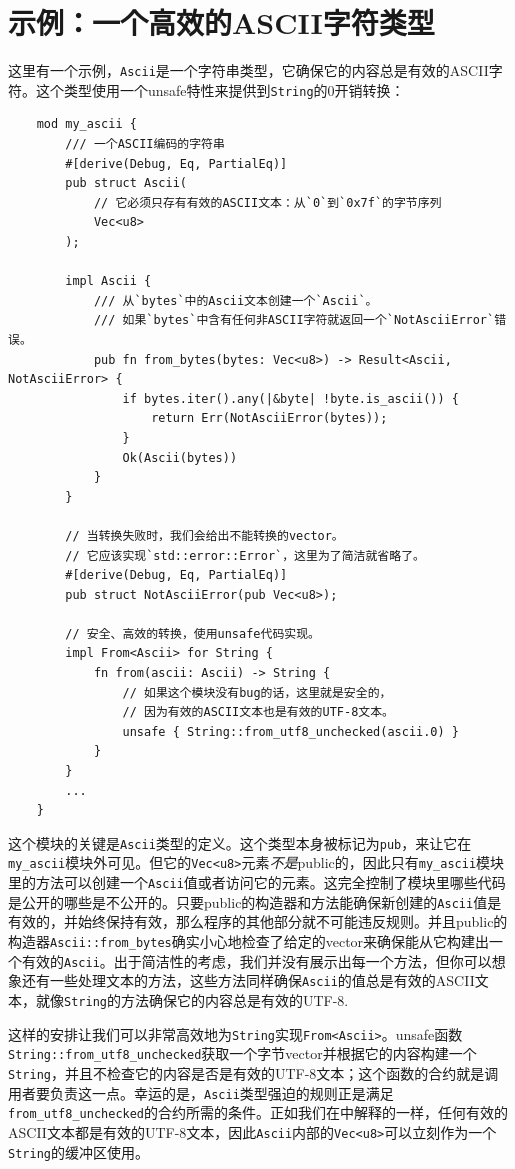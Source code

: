 \section{示例：一个高效的ASCII字符类型}
这里有一个示例，\texttt{Ascii}是一个字符串类型，它确保它的内容总是有效的ASCII字符。这个类型使用一个unsafe特性来提供到\texttt{String}的0开销转换：
\begin{verbatim}
    mod my_ascii {
        /// 一个ASCII编码的字符串
        #[derive(Debug, Eq, PartialEq)]
        pub struct Ascii(
            // 它必须只存有有效的ASCII文本：从`0`到`0x7f`的字节序列
            Vec<u8>
        );

        impl Ascii {
            /// 从`bytes`中的Ascii文本创建一个`Ascii`。
            /// 如果`bytes`中含有任何非ASCII字符就返回一个`NotAsciiError`错误。
            pub fn from_bytes(bytes: Vec<u8>) -> Result<Ascii, NotAsciiError> {
                if bytes.iter().any(|&byte| !byte.is_ascii()) {
                    return Err(NotAsciiError(bytes));
                }
                Ok(Ascii(bytes))
            }
        }

        // 当转换失败时，我们会给出不能转换的vector。
        // 它应该实现`std::error::Error`，这里为了简洁就省略了。
        #[derive(Debug, Eq, PartialEq)]
        pub struct NotAsciiError(pub Vec<u8>);

        // 安全、高效的转换，使用unsafe代码实现。
        impl From<Ascii> for String {
            fn from(ascii: Ascii) -> String {
                // 如果这个模块没有bug的话，这里就是安全的，
                // 因为有效的ASCII文本也是有效的UTF-8文本。
                unsafe { String::from_utf8_unchecked(ascii.0) }
            }
        }
        ...
    }
\end{verbatim}

这个模块的关键是\texttt{Ascii}类型的定义。这个类型本身被标记为\texttt{pub}，来让它在\texttt{my\_ascii}模块外可见。但它的\texttt{Vec<u8>}元素\emph{不是}public的，因此只有\texttt{my\_ascii}模块里的方法可以创建一个\texttt{Ascii}值或者访问它的元素。这完全控制了模块里哪些代码是公开的哪些是不公开的。只要public的构造器和方法能确保新创建的\texttt{Ascii}值是有效的，并始终保持有效，那么程序的其他部分就不可能违反规则。并且public的构造器\texttt{Ascii::from\_bytes}确实小心地检查了给定的vector来确保能从它构建出一个有效的\texttt{Ascii}。出于简洁性的考虑，我们并没有展示出每一个方法，但你可以想象还有一些处理文本的方法，这些方法同样确保\texttt{Ascii}的值总是有效的ASCII文本，就像\texttt{String}的方法确保它的内容总是有效的UTF-8.

这样的安排让我们可以非常高效地为\texttt{String}实现\texttt{From<Ascii>}。unsafe函数\texttt{String::from\_utf8\_unchecked}获取一个字节vector并根据它的内容构建一个\texttt{String}，并且不检查它的内容是否是有效的UTF-8文本；这个函数的合约就是调用者要负责这一点。幸运的是，\texttt{Ascii}类型强迫的规则正是满足\texttt{from\_utf8\_unchecked}的合约所需的条件。正如我们在中解释的一样，任何有效的ASCII文本都是有效的UTF-8文本，因此\texttt{Ascii}内部的\texttt{Vec<u8>}可以立刻作为一个\texttt{String}的缓冲区使用。

